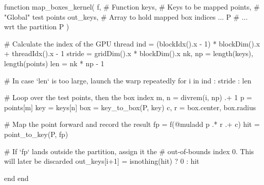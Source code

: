 \begin{jllisting}[float, floatplacement=hb!, language=julia, style=jlcodestyle, label=lst:gpu_kernel, caption=GPU kernel to calculate $f(\mathcal{B})$]
    function map_boxes_kernel(
            f,          # Function
            keys,       # Keys to be mapped
            points,     # "Global" test points
            out_keys,   # Array to hold mapped box indices ...
            P           # ... wrt the partition P
        )

        # Calculate the index of the GPU thread
        ind = (blockIdx().x - 1) * blockDim().x + threadIdx().x - 1
        stride = gridDim().x * blockDim().x
        nk, np = length(keys), length(points)
        len = nk * np - 1

        # In case `len` is too large, launch the warp repeatedly
        for i in ind : stride : len
        
            # Loop over the test points, then the box index
            m, n = divrem(i, np) .+ 1
            p    = points[m]
            key  = keys[n]
            box  = key_to_box(P, key)
            c, r = box.center, box.radius

            # Map the point forward and record the result
            fp   = f(@muladd p .* r .+ c)
            hit  = point_to_key(P, fp)

            # If `fp` lands outside the partition, assign it the
            # out-of-bounds index 0. This will later be discarded
            out_keys[i+1] = isnothing(hit) ? 0 : hit

        end
    end
\end{jllisting}

